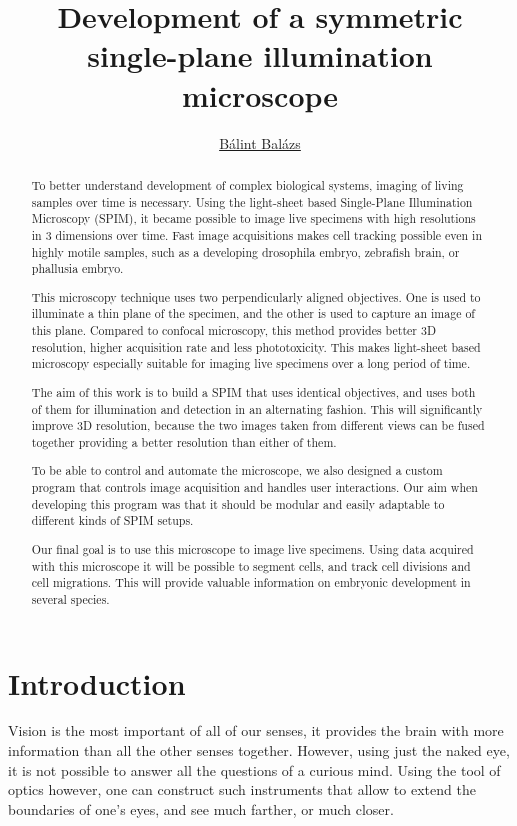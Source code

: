 \documentclass{tdk_style}
\author{\href{mailto:balint.balazs@molbiol.eu}{Bálint Balázs}}
\title{Development of a symmetric single-plane illumination microscope}
\begin{document}
\maketitle

\begin{abstract}
To better understand development of complex biological systems, imaging of living samples over time is necessary. Using the light-sheet based Single-Plane Illumination Microscopy (SPIM), it became possible to image live specimens with high resolutions in 3 dimensions over time. Fast image acquisitions makes cell tracking possible even in highly motile samples, such as a developing drosophila embryo, zebrafish brain, or phallusia embryo. 

This microscopy technique uses two perpendicularly aligned objectives. One is used to illuminate a thin plane of the specimen, and the other is used to capture an image of this plane. Compared to confocal microscopy, this method provides better 3D resolution, higher acquisition rate and less phototoxicity. This makes light-sheet based microscopy especially suitable for imaging live specimens over a long period of time.

The aim of this work is to build a SPIM that uses identical objectives, and uses both of them for illumination and detection in an alternating fashion. This will significantly improve 3D resolution, because the two images taken from different views can be fused together providing a better resolution than either of them.

To be able to control and automate the microscope, we also designed a custom program that controls image acquisition and handles user interactions. Our aim when developing this program was that it should be modular and easily adaptable to different kinds of SPIM setups.

Our final goal is to use this microscope to image live specimens. Using data acquired with this microscope it will be possible to segment cells, and track cell divisions and cell migrations. This will provide valuable information on embryonic development in several species.
\end{abstract}

\tableofcontents




\chapter{Introduction}
Vision is the most important of all of our senses, it provides the brain with more information than all the other senses together. However, using just the naked eye, it is not possible to answer all the questions of a curious mind. Using the tool of optics however, one can construct such instruments that allow to extend the boundaries of one's eyes, and see much farther, or much closer.
\end{document}
